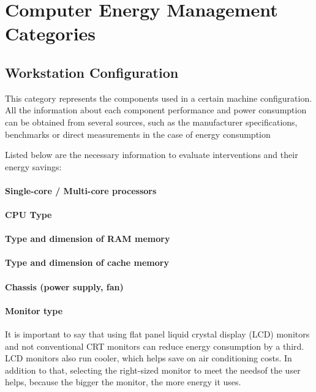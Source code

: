     \section{Computer Energy Management Categories} \label{sec2:energy_categories}
    
    \subsection{Workstation Configuration}\label{sec2:workstation_configuration}
        This category represents the components used in a certain machine configuration. All the information about each component performance and power consumption can be obtained from several sources, such as the manufacturer specifications, benchmarks or direct measurements in the case of energy consumption
                
        Listed below are the necessary information to evaluate interventions and their energy savings:
            \paragraph*{Single-core / Multi-core processors}%
            \paragraph*{CPU Type}%
            \paragraph*{Type and dimension of RAM memory}%
            \paragraph*{Type and dimension of cache memory}%
            \paragraph*{Chassis (power supply, fan)}%
            \paragraph*{Monitor type} It is important to say that using flat panel liquid crystal display (LCD) monitors and not conventional CRT monitors can reduce energy consumption by a third. LCD monitors also run cooler, which helps save on air conditioning costs. In addition to that, selecting the right-sized monitor to meet the needsof the user helps, because the bigger the monitor, the more energy it uses.

